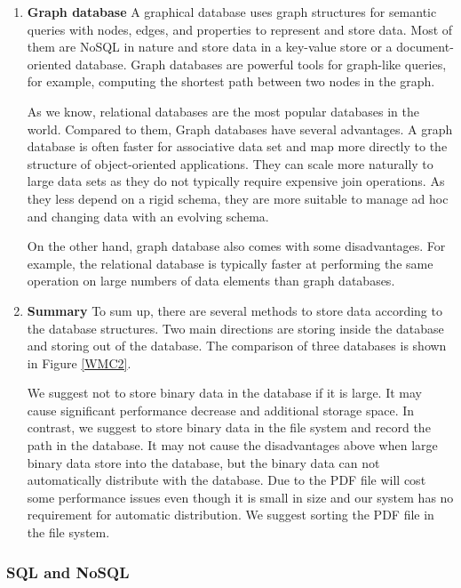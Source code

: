 \begin{enumerate}
	
	
	\item\textbf{Graph database}
	\setlength{\parindent}{1em}	
	A graphical database uses graph structures for semantic queries with nodes, edges, and properties to represent and store data.
	Most of them are NoSQL in nature and store data in a key-value store or a document-oriented database.
	Graph databases are powerful tools for graph-like queries, for example, computing the shortest path between two nodes in the graph.
	
	As we know, relational databases are the most popular databases in the world.
	Compared to them, Graph databases have several advantages.
	A graph database is often faster for associative data set and map more directly to the structure of object-oriented applications.
	They can scale more naturally to large data sets as they do not typically require expensive join operations.
	As they less depend on a rigid schema, they are more suitable to manage ad hoc and changing data with an evolving schema.
	
	On the other hand, graph database also comes with some disadvantages.
	For example, the relational database is typically faster at performing the same operation on large numbers of data elements than graph databases.
	
	\item\textbf{Summary}
	\setlength{\parindent}{1em}	
	To sum up, there are several methods to store data according to the database structures.
	Two main directions are storing inside the database and storing out of the database.
	The comparison of three databases is shown in Figure \ref{WMC2}.
	
	We suggest not to store binary data in the database if it is large.
	It may cause significant performance decrease and additional storage space.
	In contrast, we suggest to store binary data in the file system and record the path in the database.
	It may not cause the disadvantages above when large binary data store into the database, 
	but the binary data can not automatically distribute with the database.
	Due to the PDF file will cost some performance issues even though it is small in size and our system has no requirement for automatic distribution.
	We suggest sorting the PDF file in the file system.
	
\end{enumerate}

\subsubsection{SQL and NoSQL}

